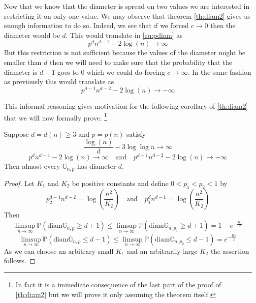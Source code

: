 Now that we know that the diameter is spread on two values we are interested in restricting it on only one value. 
We may observe that theorem \eqref{th:diam2} gives us enough information to do so.
Indeed, we see that if we forced $c \to 0$ then the diameter would be $d$. This would translate in \eqref{eq:pdiam} as
\begin{equation}
	p^dn^{d-1} - 2\log(n) \longrightarrow \infty
\end{equation}
But this restriction is not sufficient because the values of the diameter might be smaller than $d$ then we will need to make sure that the probability that the diameter is $d-1$ goes to 0 which we could do forcing $c \to \infty$.
In the same fashion as previously this would translate as
\begin{equation}
	p^{d-1}n^{d-2} - 2 \log(n) \longrightarrow -\infty
\end{equation}

This informal reasoning gives motivation for the following corollary of \eqref{th:diam2} that we will now formally prove. 
\footnote{In fact it is a immediate consequence of the last part of the proof of \eqref{th:diam2} but we will prove it only assuming the theorem itself.}
\begin{corollary}\label{th:aediam}
	Suppose $d = d(n) \geq 3$ and $p = p(n)$ satisfy
	\begin{equation}
		\frac{\log(n)}{d} - 3\log\log n \to \infty
	\end{equation}
	\begin{equation}
		p^dn^{d-1} - 2\log(n) \longrightarrow \infty \quad \text{and} \quad
		p^{d-1}n^{d-2} - 2 \log(n) \longrightarrow -\infty
	\end{equation}
	Then almost every $\mathbb{G}_{n,p}$ has diameter $d$.
\end{corollary}
\begin{proof}
	Let $K_1$ and $K_2$ be positive constants and define $0<p_1<p_2<1$ by
	\begin{equation}
		p_2^{d-1}n^{d-2} = \log(\frac{n^2}{K_2}) \quad \text{and} \quad p_1^{d}n^{d-1} = \log(\frac{n^2}{K_2})	
	\end{equation}
	Then 
	\begin{equation}
		\limsup_{n \to \infty} \mathbb{P}(\text{diam}\mathbb{G}_{n,p} \geq d+1 )
		\leq  \limsup_{n \to \infty} \mathbb{P}(\text{diam}\mathbb{G}_{n,p_1} \geq d+1 ) = 1 - e^{-\frac{K_1}{2}}
	\end{equation}
	\begin{equation}
		\limsup_{n \to \infty} \mathbb{P}(\text{diam}\mathbb{G}_{n,p} \leq d-1 )
		\leq  \limsup_{n \to \infty} \mathbb{P}(\text{diam}\mathbb{G}_{n,p_2} \leq d-1 ) = e^{-\frac{K_2}{2}}
	\end{equation}
	As we can choose an arbitrary small $K_1$ and an arbitrarily large $K_2$ the assertion follows.
\end{proof}


